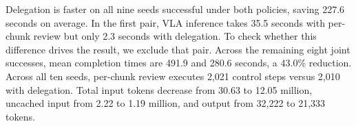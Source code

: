Delegation is faster on all nine seeds successful under both policies, saving 227.6 seconds on average. In the first pair, VLA inference takes 35.5 seconds with per-chunk review but only 2.3 seconds with delegation. To check whether this difference drives the result, we exclude that pair. Across the remaining eight joint successes, mean completion times are 491.9 and 280.6 seconds, a 43.0\% reduction. Across all ten seeds, per-chunk review executes 2,021 control steps versus 2,010 with delegation. Total input tokens decrease from 30.63 to 12.05 million, uncached input from 2.22 to 1.19 million, and output from 32,222 to 21,333 tokens.


